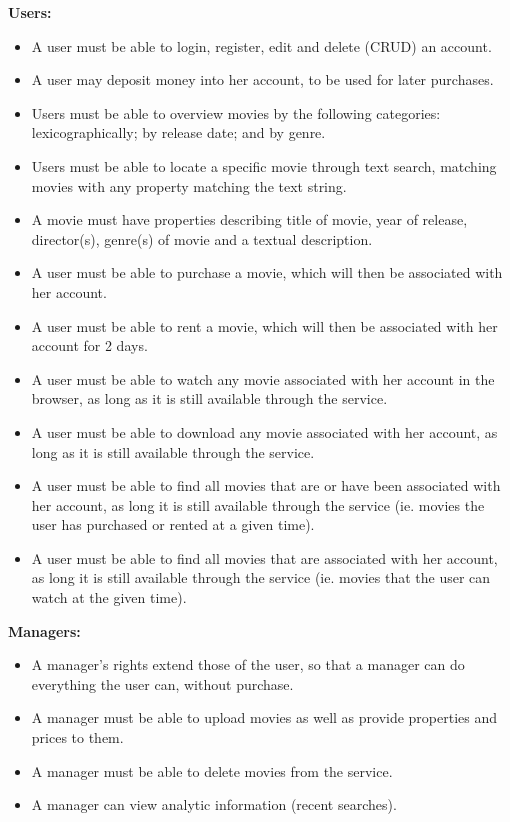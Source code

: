 \textbf{Users:}
\begin{itemize}
\item A user must be able to login, register, edit and delete (CRUD) an account.
\item A user may deposit money into her account, to be used for later purchases.
\item Users must be able to overview movies by the following categories: lexicographically; by release date; and by genre.
\item Users must be able to locate a specific movie through text search, matching movies with any property matching the text string.
\item A movie must have properties describing title of movie, year of release, director(s), genre(s) of movie and a textual description.
\item A user must be able to purchase a movie, which will then be associated with her account.
\item A user must be able to rent a movie, which will then be associated with her account for 2 days.
\item A user must be able to watch any movie associated with her account in the browser, as long as it is still available through the service.
\item A user must be able to download any movie associated with her account, as long as it is still available through the service.
\item A user must be able to find all movies that are or have been associated with her account, as long it is still available through the service (ie. movies the user has purchased or rented at a given time).
\item A user must be able to find all movies that are associated with her account, as long it is still available through the service (ie. movies that the user can watch at the given time).
\end{itemize}
\textbf{Managers:}
\begin{itemize}
\item A manager's rights extend those of the user, so that a manager can do everything the user can, without purchase.
\item A manager must be able to upload movies as well as provide properties and prices to them.
\item A manager must be able to delete movies from the service.
\item A manager can view analytic information (recent searches).
\end{itemize}

